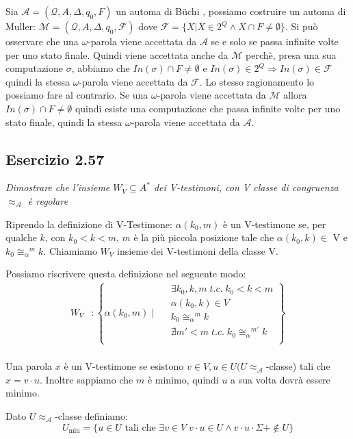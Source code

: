 \documentclass[12pt]{article}
\newcommand{\A}{\ensuremath{\mathcal{A}}\xspace}
\newcommand{\Buchi}{\ensuremath{\mathcal{A} = (\mathcal{Q},A,\Delta,q_0,F)}\xspace}
\newcommand{\congAlpha}{\ensuremath{\cong_\alpha}\xspace}
\newcommand{\congAlphaM}{\ensuremath{\congAlpha^m}\xspace}
\newcommand{\buchi}{B\"uchi }
\newcommand{\vtest}{\ensuremath{\alpha(k_0,m)}\xspace}
\begin{document}
Sia $\Buchi$ un automa di \buchi, possiamo costruire un automa di Muller: $\mathcal{M} = (\mathcal{Q},A,\Delta,q_0,\mathcal{F})$ dove $\mathcal{F} = \{ X | X \in 2^Q \land X \cap F \neq \emptyset\}$. Si può osservare che una $\omega$-parola viene accettata da $\A$ se e solo se passa infinite volte per uno stato finale. Quindi viene accettata anche da $\mathcal{M}$ perchè, presa una sua computazione $\sigma$, abbiamo che $In(\sigma) \cap F \neq \emptyset $ e $ In(\sigma) \in 2^Q \Rightarrow In(\sigma) \in \mathcal{F}$ quindi la stessa $\omega$-parola viene accettata da $\mathcal{F}$. Lo stesso ragionamento lo possiamo fare al contrario. Se una $\omega$-parola viene accettata da $\mathcal{M}$ allora $In(\sigma) \cap F \neq \emptyset $ quindi esiste una computazione che passa infinite volte per uno stato finale, quindi 
la stessa $\omega$-parola viene accettata da $\A$. 

\subsection*{Esercizio 2.57}
\textit{Dimostrare che l'insieme $W_V\subseteq A^*$ dei V-testimoni, con V classe di congruenza $\approx_\mathcal{A}$ è regolare}

Riprendo la definizione di V-Testimone:
$\vtest$ è un V-testimone se, per qualche $k$, con $k_0<k<m$, $m$ è la più piccola posizione tale che $\alpha(k_0,k) \in$ V e $k_0 \congAlphaM k$. Chiamiamo $W_V$ insieme dei V-testimoni della classe V.

\medskip

Possiamo riscrivere questa definizione nel seguente modo:
\begin{align*}
	W_V &: \left\lbrace \vtest\;|\;\begin{aligned}
 		\;&\exists k_0,k,m\;t.c.\;k_0<k<m\\ 
 		\;& \alpha(k_0,k) \in V \\ 
 		\;&k_0 \congAlphaM k \\
 		\;&\nexists m'<m\;t.c.\; k_0\congAlpha^{m'}k\\
		\end{aligned} \right\rbrace\\
\end{align*}

Una parola $x$ è un V-testimone se esistono $v \in V, u \in U (U \approx_\mathcal{A}$-classe) tali che $x=v\cdot u$. Inoltre  sappiamo che $m$ è minimo, quindi $u$ a sua volta dovrà essere minimo.

Dato $U \approx_\mathcal{A}$-classe definiamo:
$$U_{\textrm{min}} = \{ u \in U \textrm{ tali che } \exists v \in V\; v \cdot u \in U \land v \cdot u \cdot \Sigma+ \notin U \}$$
\end{document}
